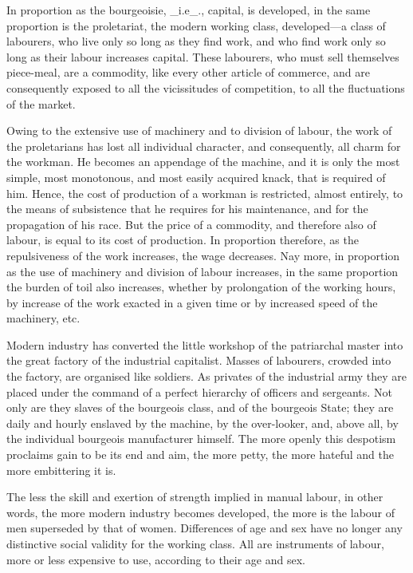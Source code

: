 In proportion as the bourgeoisie, _i.e_., capital, is developed, in the
same proportion is the proletariat, the modern working class,
developed—a class of labourers, who live only so long as they find
work, and who find work only so long as their labour increases capital.
These labourers, who must sell themselves piece-meal, are a commodity,
like every other article of commerce, and are consequently exposed to
all the vicissitudes of competition, to all the fluctuations of the
market.

Owing to the extensive use of machinery and to division of labour, the
work of the proletarians has lost all individual character, and
consequently, all charm for the workman. He becomes an appendage of the
machine, and it is only the most simple, most monotonous, and most
easily acquired knack, that is required of him. Hence, the cost of
production of a workman is restricted, almost entirely, to the means of
subsistence that he requires for his maintenance, and for the
propagation of his race. But the price of a commodity, and therefore
also of labour, is equal to its cost of production. In proportion
therefore, as the repulsiveness of the work increases, the wage
decreases. Nay more, in proportion as the use of machinery and division
of labour increases, in the same proportion the burden of toil also
increases, whether by prolongation of the working hours, by increase of
the work exacted in a given time or by increased speed of the
machinery, etc.

Modern industry has converted the little workshop of the patriarchal
master into the great factory of the industrial capitalist. Masses of
labourers, crowded into the factory, are organised like soldiers. As
privates of the industrial army they are placed under the command of a
perfect hierarchy of officers and sergeants. Not only are they slaves
of the bourgeois class, and of the bourgeois State; they are daily and
hourly enslaved by the machine, by the over-looker, and, above all, by
the individual bourgeois manufacturer himself. The more openly this
despotism proclaims gain to be its end and aim, the more petty, the
more hateful and the more embittering it is.

The less the skill and exertion of strength implied in manual labour,
in other words, the more modern industry becomes developed, the more is
the labour of men superseded by that of women. Differences of age and
sex have no longer any distinctive social validity for the working
class. All are instruments of labour, more or less expensive to use,
according to their age and sex.

